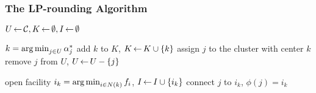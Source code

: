 \documentclass[handout, hyperref, xcolor=dvipsnames]{beamer}
\begin{document}
\begin{frame}
  \frametitle{The LP-rounding Algorithm}
    \begin{algorithm}[H]
      \begin{algorithmic}[1]
        \State $U {\,\leftarrow\,} {\cal C}, K {\,\leftarrow\,} \emptyset, I {\,\leftarrow\,} \emptyset$

        \State $k = \operatorname*{arg\,min}_{j\in U} \alpha_j^\ast$
        \State add $k$ to $K$, $K {\,\leftarrow\,} K \cup \{k\}$
        \State assign $j$ to the cluster with center $k$
        \State remove $j$ from $U$, $U {\,\leftarrow\,} U - \{j\}$
        \EndFor
        \EndWhile
        

         
        \State open facility $i_k = \operatorname*{arg\,min}_{i\in N(k)} f_i$, $I{\,\leftarrow\,} I \cup \{i_k\}$
        \State connect $j$ to $i_k$, $\phi(j) = i_k$
        \EndFor
        \EndFor
      \end{algorithmic}
    \end{algorithm}
\end{frame}
\end{document}
